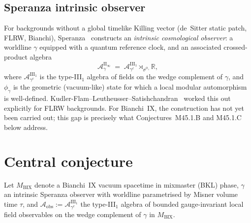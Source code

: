 \documentclass[12pt,a4paper]{article}
\begin{document}
\subsection{Speranza intrinsic observer}\label{ssec:Speranza}

For backgrounds without a global timelike Killing vector
(de~Sitter static patch, FLRW, Bianchi),
Speranza~\cite{Speranza2025} constructs an \emph{intrinsic
cosmological observer}: a worldline $\gamma$ equipped with a
quantum reference clock, and an associated crossed-product algebra
\begin{equation}
  \mathcal{A}_\gamma^{\mathrm{II}_\infty}
  \;=\; \mathcal{A}_{\gamma^c}^{\mathrm{III}_1}
        \rtimes_{\sigma^{\phi_\gamma}}\mathbb{R},
  \label{eq:speranza}
\end{equation}
where $\mathcal{A}_{\gamma^c}^{\mathrm{III}_1}$ is the type-III$_1$
algebra of fields on the wedge complement of $\gamma$, and
$\phi_\gamma$ is the geometric (vacuum-like) state for which a local
modular automorphism is well-defined.
Kudler-Flam--Leutheusser--Satishchandran~\cite{KLS2024} worked this
out explicitly for FLRW backgrounds.
For Bianchi~IX, the construction has not yet been carried out; this
gap is precisely what Conjectures~M45.1.B and M45.1.C below address.

\section{Central conjecture}\label{sec:conjecture}

Let $M_{\mathrm{BIX}}$ denote a Bianchi~IX vacuum spacetime in
mixmaster (BKL) phase, $\gamma$ an intrinsic Speranza observer with
worldline parametrised by Misner volume time $\tau$, and
$\mathcal{A}_{\mathrm{obs}} := \mathcal{A}_{\gamma^c}^{\mathrm{III}_1}$
the type-III$_1$ algebra of bounded gauge-invariant local field
observables on the wedge complement of $\gamma$ in
$M_{\mathrm{BIX}}$.
\end{document}
